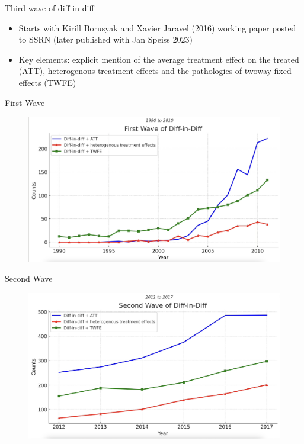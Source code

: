 \documentclass{beamer}
\begin{document}
\begin{frame}{Third wave of diff-in-diff}

\begin{itemize}

\item Starts with Kirill Borusyak and Xavier Jaravel (2016) working paper posted to SSRN (later published with Jan Speiss 2023)
\item Key elements: explicit mention of the average treatment effect on the treated (ATT), heterogenous treatment effects and the pathologies of twoway fixed effects (TWFE)
\end{itemize}

\end{frame}


\begin{frame}{First Wave}

	\begin{figure}
	\includegraphics[scale=0.15]{./lecture_includes/wave1}
	\end{figure}

\end{frame}


\begin{frame}{Second Wave}

	\begin{figure}
	\includegraphics[scale=0.15]{./lecture_includes/wave2}
	\end{figure}

\end{frame}
\end{document}
